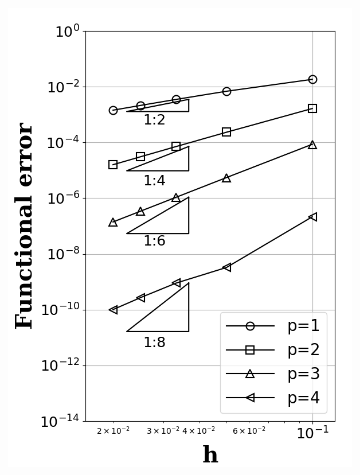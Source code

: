 \documentclass[a4paper]{article}
\begin{document}
\begin{figure}[!htbp]
\begin{subfigure}{0.325\textwidth}
    \includegraphics[width=1.0\linewidth]{figures/beta1.png}
    \label{fig:func_ill}
  \end{subfigure}
  \begin{subfigure}{0.325\textwidth}
    \centering

\end{subfigure}
\end{figure}
\end{document}
